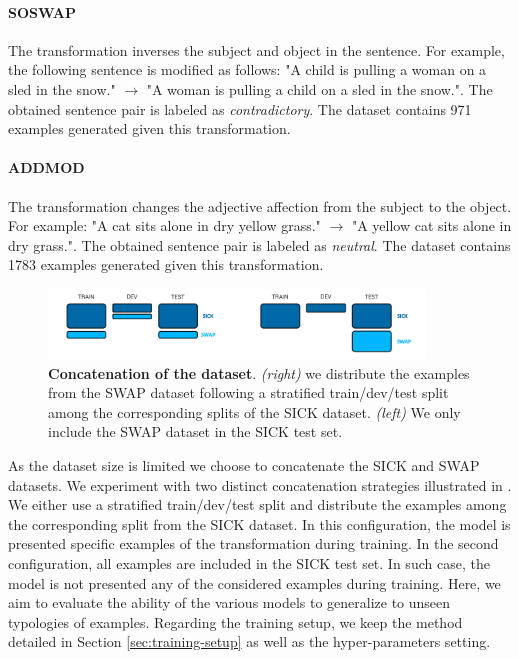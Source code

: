 \paragraph{SOSWAP} The transformation inverses the subject and object in the sentence. For example, the following sentence is modified as follows: "A child is pulling  a woman on a sled in the snow." $\rightarrow$ "A woman is pulling a child on a sled in the snow.". The obtained sentence pair is labeled as \textit{contradictory}. The dataset contains 971 examples generated given this transformation.

\paragraph{ADDMOD}  The transformation changes the adjective affection from the subject to the object. For example: "A cat sits  alone in dry yellow grass." $\rightarrow$ "A yellow cat sits alone in dry grass.". The obtained sentence pair is labeled as \textit{neutral}. The dataset contains 1783 examples generated given this transformation.

\begin{figure}[!htb]
\begin{center}
\includegraphics[width=10cm]{images/swap-split.png}
\end{center}
\caption{\textbf{Concatenation of the dataset}. \textit{(right)} we distribute the examples from the SWAP dataset following a stratified train/dev/test split among the corresponding splits of the SICK dataset. \textit{(left)} We only include the SWAP dataset in the SICK test set.}
\end{figure}

As the dataset size is limited we choose to concatenate the SICK and SWAP datasets. We experiment with two distinct concatenation strategies illustrated in . We either use a stratified train/dev/test split and distribute the examples among the corresponding split from the SICK dataset. In this configuration, the model is presented specific examples of the transformation during training. In the second configuration, all examples are included in the SICK test set. In such case, the model is not presented any of the considered examples during training. Here, we aim to evaluate the ability of the various models to generalize to unseen typologies of examples. Regarding the training setup, we keep the method detailed in Section \ref{sec:training-setup} as well as the hyper-parameters setting.

